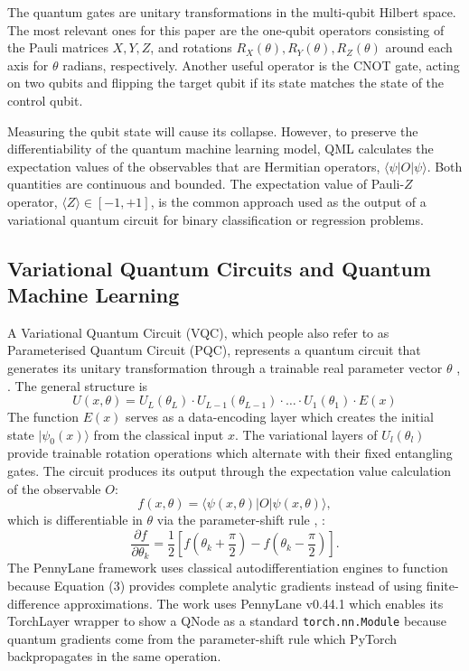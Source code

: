 \documentclass[preprint,12pt]{elsarticle}
\begin{document}
The quantum gates are unitary transformations in the multi-qubit Hilbert space. The most relevant ones for this paper are the one-qubit operators consisting of the Pauli matrices $X, Y, Z$, and rotations $R_X(\theta), R_Y(\theta), R_Z(\theta)$ around each axis for $\theta$ radians, respectively. Another useful operator is the CNOT gate, acting on two qubits and flipping the target qubit if its state matches the state of the control qubit.

Measuring the qubit state will cause its collapse. However, to preserve the differentiability of the quantum machine learning model, QML calculates the expectation values of the observables that are Hermitian operators, $\langle \psi|O|\psi \rangle$. Both quantities are continuous and bounded. The expectation value of Pauli-$Z$ operator, $\langle Z \rangle \in [-1, +1]$, is the common approach used as the output of a variational quantum circuit for binary classification or regression problems.

\subsection{Variational Quantum Circuits and Quantum Machine Learning}
A Variational Quantum Circuit (VQC), which people also refer to as Parameterised Quantum Circuit (PQC), represents a quantum circuit that generates its unitary transformation through a trainable real parameter vector $\theta$ \cite{b10}, \cite{b24}. The general structure is
\begin{equation}
U(x, \theta) = U_L(\theta_L) \cdot U_{L-1}(\theta_{L-1}) \cdot \ldots \cdot U_1(\theta_1) \cdot E(x)
\end{equation}
The function $E(x)$ serves as a data-encoding layer which creates the initial state $|\psi_0(x)\rangle$ from the classical input $x$. The variational layers of $U_l(\theta_l)$ provide trainable rotation operations which alternate with their fixed entangling gates. The circuit produces its output through the expectation value calculation of the observable $O$:
\begin{equation}
f(x, \theta) = \langle \psi(x, \theta) | O | \psi(x, \theta) \rangle,
\end{equation}
which is differentiable in $\theta$ via the parameter-shift rule \cite{b22}, \cite{b23}:
\begin{equation}
\frac{\partial f}{\partial \theta_k} = \frac{1}{2} \left[ f\left(\theta_k + \frac{\pi}{2}\right) - f\left(\theta_k - \frac{\pi}{2}\right) \right].
\end{equation}
The PennyLane framework uses classical autodifferentiation engines to function because Equation (3) provides complete analytic gradients instead of using finite-difference approximations. The work uses PennyLane v0.44.1 which enables its TorchLayer wrapper to show a QNode as a standard \texttt{torch.nn.Module} because quantum gradients come from the parameter-shift rule which PyTorch backpropagates in the same operation.
\end{document}
